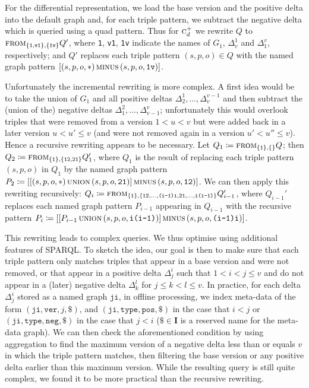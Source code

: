 \documentclass{llncs}
\newcommand{\I}{\ensuremath{\mathbf{I}}\xspace}
\newcommand{\ssyn}[3]{[\ensuremath{#1\,\textsc{#2}\,#3}]}
\newcommand{\suni}[2]{\ssyn{#1}{union}{#2}}
\newcommand{\sminus}[2]{\ssyn{#1}{minus}{#2}}
\newcommand{\sfrom}[3]{\ensuremath{\textsc{from}_{#2,#3}#1}}
\begin{document}
For the differential representation, we load the base version and the positive delta into the default graph and, for each triple pattern, we subtract the negative delta which is queried using a quad pattern. Thus for $\textsc{c}_d^{+}$ we rewrite $Q$ to  \sfrom{Q'}{\{\texttt{1},\texttt{v1}\}}{\{\texttt{1v}\}}, where \texttt{1}, \texttt{v1}, \texttt{1v} indicate the names of $G_1$, $\Delta_v^1$ and $\Delta_1^v$, respectively; and $Q'$ replaces each triple pattern $(s,p,o) \in Q$ with the named graph pattern $\sminus{(s,p,o,*)}{(s,p,o,\texttt{1v})}$. 

Unfortunately the incremental rewriting is more complex. A first idea would be to take the union of $G_1$ and all positive deltas $\Delta_2^1, \ldots, \Delta_v^{v-1}$ and then subtract the (union of the) negative deltas $\Delta_1^2, \ldots, \Delta_{v-1}^{v}$; unfortunately this would overlook triples that were removed from a version $1 < u < v$ but were added back in a later version $u < u' \leq v$ (and were not removed again in a version $u' < u'' \leq v$). Hence a recursive rewriting appears to be necessary. Let $Q_1 \coloneqq \sfrom{Q}{\{\texttt{1}\}}{\{\}}$; then $Q_2 \coloneqq \sfrom{Q'_1}{\{\texttt{1}\}}{\{\texttt{12},\texttt{21}\}}$, where $Q_1$ is the result of replacing each triple pattern $(s,p,o)$ in $Q_1$ by the named graph pattern $P_2 \coloneqq \sminus{\suni{(s,p,o,*)}{(s,p,o,\texttt{21})}}{(s,p,o,\texttt{12})}$. We can then apply this rewriting recursively: $Q_i \coloneqq \sfrom{Q_{i-1}'}{\{\texttt{1}\}}{\{\texttt{12},\ldots,\texttt{(i-1)i},\texttt{21},\ldots,\texttt{i(i-1)}\}}$, where $Q_{i-1}'$ replaces each named graph pattern $P_{i-1}$ appearing in $Q_{i-1}$ with the recursive pattern $P_i \coloneqq \sminus{\suni{P_{i-1}}{(s,p,o,\texttt{i(i-1)})}}{(s,p,o,\texttt{(i-1)i})}$.

This rewriting leads to complex queries. We thus optimise using additional features of SPARQL. To sketch the idea, our goal is then to make sure that each triple pattern only matches triples that appear in a base version and were not removed, or that appear in a positive delta $\Delta_{j}^{i}$ such that $1 < i < j \leq v$ and do not appear in a (later) negative delta $\Delta_{k}^{l}$ for $j \leq k < l \leq v$. In practice, for each delta $\Delta_{j}^{i}$ stored as a named graph $\texttt{ji}$, in offline processing, we index meta-data of the form $(\texttt{ji},\texttt{ver},j,\texttt{\$})$, and $(\texttt{ji},\texttt{type},\texttt{pos},\texttt{\$})$ in the case that $i < j$ or $(\texttt{ji},\texttt{type},\texttt{neg},\texttt{\$})$ in the case that $j < i$ ($\texttt{\$} \in \I$ is a reserved name for the meta-data graph). We can then check the aforementioned condition by using aggregation to find the maximum version of a negative delta less than or equals $v$ in which the triple pattern matches, then filtering the base version or any positive delta earlier than this maximum version. While the resulting query is still quite complex, we found it to be more practical than the recursive rewriting.
\end{document}

